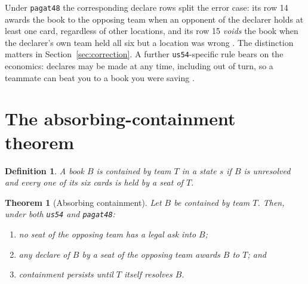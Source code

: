 \documentclass[11pt]{article}
\newtheorem{theorem}{Theorem}
\newtheorem{definition}{Definition}
\newcommand{\code}[1]{\texttt{#1}}
\begin{document}
Under \code{pagat48} the corresponding declare rows split the error case: its
row 14 awards the book to the opposing team when an opponent of the declarer
holds at least one card, regardless of other locations, and its row 15
\emph{voids} the book when the declarer's own team held all six but a location
was wrong \cite{rules48}. The distinction matters in
Section~\ref{sec:correction}. A further \code{us54}-specific rule bears on the
economics: declares may be made at any time, including out of turn, so a
teammate can beat you to a book you were saving \cite{rules54}.

\section{The absorbing-containment theorem}
\label{sec:theorem}

\begin{definition}
A book $B$ is \emph{contained} by team $T$ in a state $s$ if $B$ is unresolved
and every one of its six cards is held by a seat of $T$.
\end{definition}

\begin{theorem}[Absorbing containment]
\label{thm:absorb}
Let $B$ be contained by team $T$. Then, under both \code{us54} and
\code{pagat48}:
\begin{enumerate}
\item[(i)] no seat of the opposing team has a legal ask into $B$;
\item[(ii)] any declare of $B$ by a seat of the opposing team awards $B$ to
$T$; and
\item[(iii)] containment persists until $T$ itself resolves $B$.
\end{enumerate}
\end{theorem}
\end{document}
